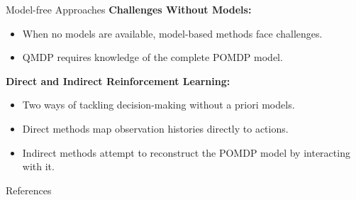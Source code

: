 \documentclass[presentation, smaller]{beamer}
\begin{document}
\begin{frame}{Model-free Approaches}
  \textbf{Challenges Without Models:}
  \begin{itemize}
    \item When no models are available, model-based methods face challenges.
    \item QMDP requires knowledge of the complete POMDP model.
  \end{itemize}

  \textbf{Direct and Indirect Reinforcement Learning:}
  \begin{itemize}
    \item Two ways of tackling decision-making without a priori models.
    \item Direct methods map observation histories directly to actions.
    \item Indirect methods attempt to reconstruct the POMDP model by interacting with it.
  \end{itemize}
\end{frame}




\begin{frame}[label={sec:org9887ed5}]{References}
\nocite{*}


\end{frame}
\end{document}
